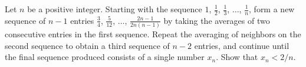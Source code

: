 Let  $n$  be a positive integer. Starting with the sequence
$1$, $\frac{1}{2}$, $\frac{1}{3}$, $\dots$, $\frac{1}{n}$,
form a new sequence of  $n-1$  entries
$\frac{3}{4}$, $\frac{5}{12}$, $\dots$, $\frac{2n-1}{2n(n-1)}$
by taking the averages of
two consecutive entries in the first sequence. Repeat the
averaging of neighbors on the second sequence to obtain a third
sequence of  $n-2$  entries, and continue until the final sequence produced
consists of a single number  $x_n$.  Show that  $x_n < 2/n$.
